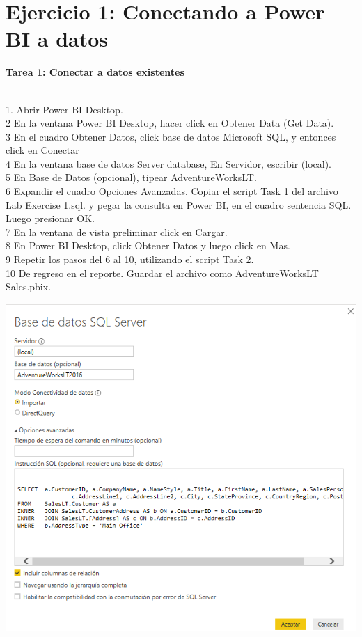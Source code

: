 \section*{Ejercicio 1: Conectando a Power BI a datos}
\item \textbf{Tarea 1: Conectar a datos existentes}
\begin{itemize}
\\ 1. Abrir Power BI Desktop.
\\ 2 En la ventana Power BI Desktop, hacer click en Obtener Data (Get Data).
\\ 3 En el cuadro Obtener Datos, click base de datos Microsoft SQL, y entonces click en Conectar
\\ 4 En la ventana base de datos Server database, En Servidor, escribir (local).
\\ 5 En Base de Datos (opcional), tipear AdventureWorksLT.
\\ 6 Expandir el cuadro Opciones Avanzadas. Copiar el script Task 1 del archivo Lab Exercise 1.sql. y pegar la consulta en Power BI, en el cuadro sentencia SQL. Luego presionar OK.
\\ 7 En la ventana de vista preliminar click en Cargar.
\\ 8 En Power BI Desktop, click Obtener Datos y luego click en Mas.
\\ 9 Repetir los pasos del 6 al 10, utilizando el script Task 2.
\\ 10 De regreso en el reporte. Guardar el archivo como AdventureWorksLT Sales.pbix.

\end{itemize} 

\begin{center}
\includegraphics[width=15cm]{./Imagenes/img1} 
\end{center}


